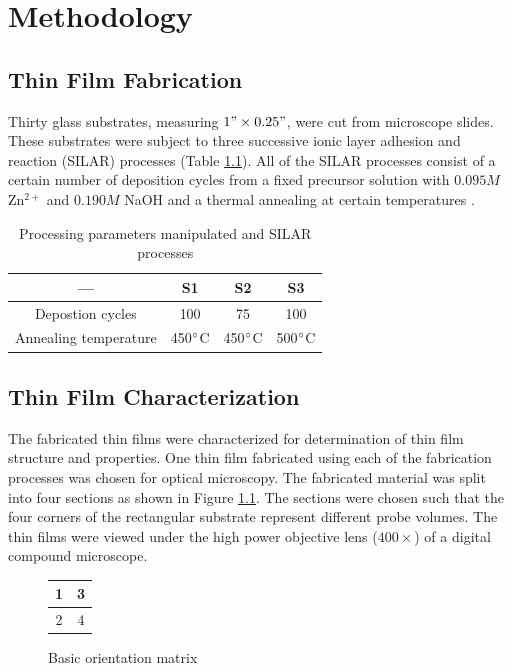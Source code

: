 \chapter{Methodology}
\section{Thin Film Fabrication}
Thirty glass substrates, measuring $1"\times0.25"$, were cut from microscope slides.
These substrates were subject to three successive ionic layer adhesion and reaction (SILAR) processes (Table \ref{tab:processes}).
All of the SILAR processes consist of a certain number of deposition cycles from a fixed precursor solution with $0.095M$ Zn$^{2+}$ and $0.190M$ NaOH and a thermal annealing at certain temperatures \cite{ gao08, florido17}.

\begin{table}
  \caption[SILAR Processes]{Processing parameters manipulated and SILAR processes}
  \centering
  \begin{tabular}{c c c c}
    \hline\hline
    --- & S1 & S2 & S3 \\
    \hline
    Depostion cycles & 100 & 75 & 100 \\
    Annealing temperature & 450$^{\circ}$C & 450$^{\circ}$C & 500$^{\circ}$C \\[1ex]
    \hline
  \end{tabular}
  \label{tab:processes}
\end{table}

\section{Thin Film Characterization}
The fabricated thin films were characterized for determination of thin film structure and properties.
One thin film fabricated using each of the fabrication processes was chosen for optical microscopy.
The fabricated material was split into four sections as shown in Figure \ref{fig:orient}.
The sections were chosen such that the four corners of the rectangular substrate represent different probe volumes.
The thin films were viewed under the high power objective lens ($400\times$) of a digital compound microscope.

\begin{figure}
  \centering
  \begin{tabular}{| c | c |}
    \hline
    1 & 3 \\
    \hline
    2 & 4 \\[0.5ex]
    \hline
  \end{tabular}
  \caption{Basic orientation matrix}
  \label{fig:orient}
\end{figure}

